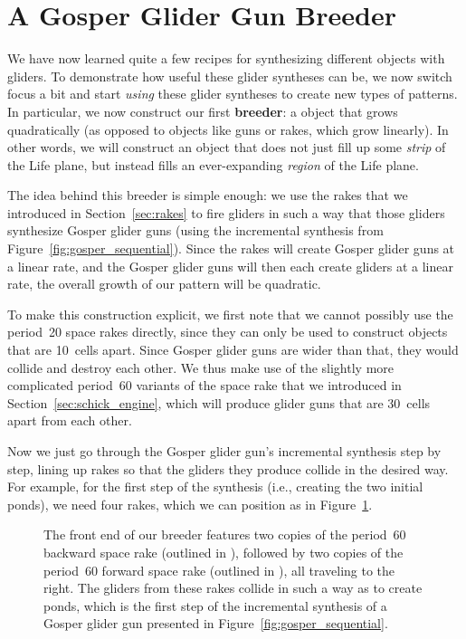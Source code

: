 \section{A Gosper Glider Gun Breeder}\label{sec:gosper_breeder}

We have now learned quite a few recipes for synthesizing different objects with gliders. To demonstrate how useful these glider syntheses can be, we now switch focus a bit and start \emph{using} these glider syntheses to create new types of patterns. In particular, we now construct our first \textbf{breeder}: a object that grows quadratically (as opposed to objects like guns or rakes, which grow linearly). In other words, we will construct an object that does not just fill up some \emph{strip} of the Life plane, but instead fills an ever-expanding \emph{region} of the Life plane.

The idea behind this breeder is simple enough: we use the rakes that we introduced in Section~\ref{sec:rakes} to fire gliders in such a way that those gliders synthesize Gosper glider guns (using the incremental synthesis from Figure~\ref{fig:gosper_sequential}). Since the rakes will create Gosper glider guns at a linear rate, and the Gosper glider guns will then each create gliders at a linear rate, the overall growth of our pattern will be quadratic.

To make this construction explicit, we first note that we cannot possibly use the period~20 space rakes directly, since they can only be used to construct objects that are 10~cells apart. Since Gosper glider guns are wider than that, they would collide and destroy each other. We thus make use of the slightly more complicated period~60 variants of the space rake that we introduced in Section~\ref{sec:schick_engine}, which will produce glider guns that are 30~cells apart from each other.

Now we just go through the Gosper glider gun's incremental synthesis step by step, lining up rakes so that the gliders they produce collide in the desired way. For example, for the first step of the synthesis (i.e., creating the two initial ponds), we need four rakes, which we can position as in Figure~\ref{fig:breeder_front}.

\begin{figure}[!htb]
	\centering
	\caption{The front end of our breeder features two copies of the period~60 backward space rake (outlined in ), followed by two copies of the period~60 forward space rake (outlined in ), all traveling to the right. The gliders from these rakes collide in such a way as to create ponds, which is the first step of the incremental synthesis of a Gosper glider gun presented in Figure~\ref{fig:gosper_sequential}.}\label{fig:breeder_front}
\end{figure}


